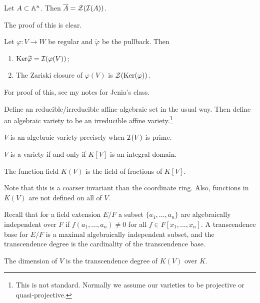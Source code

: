 \message{ !name(notes.tex)}\documentclass[10pt, twoside]{article}
\begin{document}
        \begin{prop}
            Let $A \subset \mathbb{A}^n$. Then $\overline{A} = \mathcal{Z}(\mathcal{I}(A))$.
        \end{prop}
        The proof of this is clear.

        \begin{prop}
            Let $\varphi:V \to W$ be regular and $\widetilde{\varphi}$ be the pullback. Then
            \begin{enumerate}
                \item $\mathrm{Ker} \widetilde{\varphi} = \mathcal{I}(\varphi(V))$;
                \item The Zariski closure of $\varphi(V)$ is $\mathcal{Z}(\mathrm{Ker}(\varphi))$.
            \end{enumerate}
        \end{prop}

        For proof of this, see my notes for Jenia's class.

        Define an reducible/irreducible affine algebraic set in the usual way. Then define an algebraic variety to be an irreducible affine variety.\footnote{This is not standard. Normally we assume our varieties to be projective or quasi-projective.}

        \begin{prop}
            $V$ is an algebraic variety precisely when $\mathcal{I}(V)$ is prime.
        \end{prop}

        \begin{cor}
            $V$ is a variety if and only if $K[V]$ is an integral domain.
        \end{cor}

        \begin{defn}
            The function field $K(V)$ is the field of fractions of $K[V]$.
        \end{defn}

        Note that this is a coarser invariant than the coordinate ring. Also, functions in $K(V)$ are not defined on all of $V$.

        Recall that for a field extension $E/F$ a subset $\{a_1, \ldots, a_n\}$ are algebraically independent over $F$ if $f(a_1, \ldots, a_n) \neq 0$ for all $f \in F[x_1, \ldots, x_n]$. A transcendence base for $E/F$ is a maximal algebraically independent subset, and the transcendence degree is the cardinality of the transcendence base.

        \begin{defn}
            The dimension of $V$ is the transcendence degree of $K(V)$ over $K$.
        \end{defn}
\end{document}
